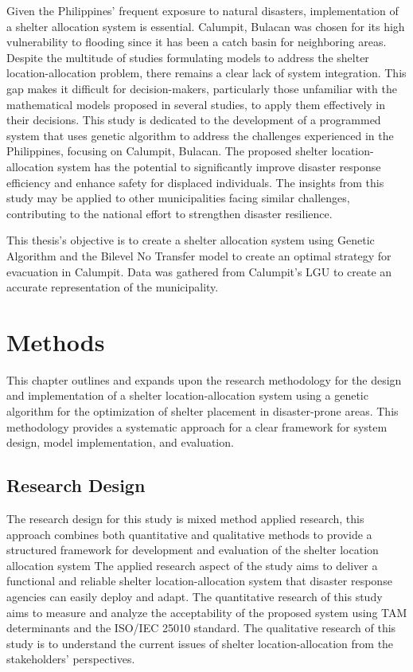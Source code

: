 \documentclass[11pt,letterpaper,]{article}
\begin{document}
	Given the Philippines’ frequent exposure to natural disasters, implementation of a shelter allocation system is essential. Calumpit, Bulacan was chosen for its high vulnerability to flooding since it has been a catch basin for neighboring areas. Despite the multitude of studies formulating models to address the shelter location-allocation problem, there remains a clear lack of system integration. This gap makes it difficult for decision-makers, particularly those unfamiliar with the mathematical models proposed in several studies, to apply them effectively in their decisions. This study is dedicated to the development of a programmed system that uses genetic algorithm to address the challenges experienced in the Philippines, focusing on Calumpit, Bulacan. The proposed shelter location-allocation system has the potential to significantly improve disaster response efficiency and enhance safety for displaced individuals. The insights from this study may be applied to other municipalities facing similar challenges, contributing to the national effort to strengthen disaster resilience.
	
	This thesis’s objective is to create a shelter allocation system using Genetic Algorithm and the Bilevel No Transfer model to create an optimal strategy for evacuation in Calumpit. Data was gathered from Calumpit’s LGU to create an accurate representation of the municipality.
	

\section{Methods}

This chapter outlines and expands upon the research methodology for the
design and implementation of a shelter location-allocation system using a genetic
algorithm for the optimization of shelter placement in disaster-prone areas. This
methodology provides a systematic approach for a clear framework for system
design, model implementation, and evaluation.
	
	\subsection{Research Design}
	
	The research design for this study is mixed method applied research, this approach combines both quantitative and qualitative methods to provide a structured framework for development and evaluation of the shelter location allocation system
	The applied research aspect of the study aims to deliver a functional and reliable shelter location-allocation system that disaster response agencies can easily deploy and adapt. The quantitative research of this study aims to measure and analyze the acceptability of the proposed system using TAM determinants and the ISO/IEC 25010 standard. The qualitative research of this study is to understand the current issues of shelter location-allocation from the stakeholders’ perspectives.
	
\end{document}
